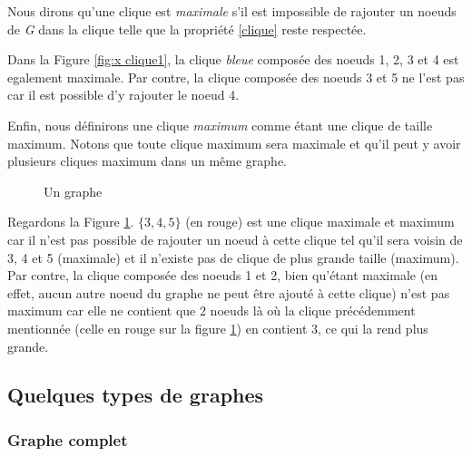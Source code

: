 \documentclass[12pt,a4paper]{article}
\begin{document}
Nous dirons qu'une clique est \textit{maximale} s'il est impossible de rajouter un noeuds de \emph{G} dans la clique telle que la propriété \eqref{clique} reste respectée.

Dans la Figure \ref{fig:x clique1}, la clique \textit{bleue} composée des noeuds 1, 2, 3 et 4 est egalement maximale. Par contre, la clique composée des noeuds 3 et 5 ne l'est pas car il est possible d'y rajouter le noeud 4.

Enfin, nous définirons une clique \textit{maximum} comme étant une clique de taille maximum. Notons que toute clique maximum sera maximale et qu'il peut y avoir plusieurs cliques maximum dans un même graphe.

\begin{figure}[h]
  \begin{center}
\caption{Un graphe}
  \label{fig:x clique2}
\end{center}
\end{figure}

Regardons la Figure \ref{fig:x clique2}. $ \{3, 4, 5\}$ (en rouge) est une clique maximale et maximum car il n'est pas possible de rajouter un noeud à cette clique tel qu'il sera voisin de 3, 4 et 5 (maximale) et il n'existe pas de clique de plus grande taille (maximum). Par contre, la clique composée des noeuds 1 et 2, bien qu'étant maximale (en effet, aucun autre noeud du graphe ne peut être ajouté à cette clique) n'est pas maximum car elle ne contient que 2 noeuds là où la clique précédemment mentionnée (celle en rouge sur la figure \ref{fig:x clique2}) en contient 3, ce qui la rend plus grande.

\subsection{Quelques types de graphes}%
\label{subsec:graphes}

\subsubsection*{Graphe complet}
\label{subsubsec:complet}
\end{document}
